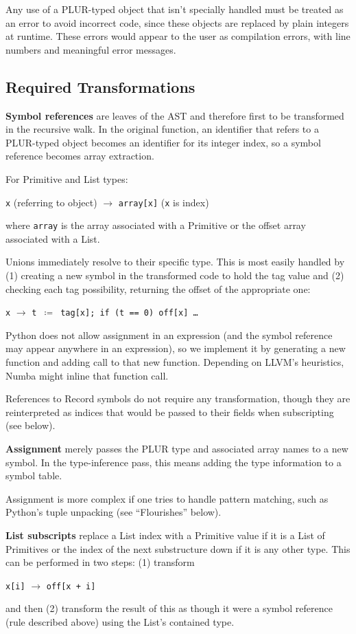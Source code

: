\documentclass[10pt, conference, compsocconf]{IEEEtran}
\begin{document}
Any use of a PLUR-typed object that isn't specially handled must be treated as an error to avoid incorrect code, since these objects are replaced by plain integers at runtime. These errors would appear to the user as compilation errors, with line numbers and meaningful error messages.

\subsection{Required Transformations}

{\bf Symbol references} are leaves of the AST and therefore first to be transformed in the recursive walk. In the original function, an identifier that refers to a PLUR-typed object becomes an identifier for its integer index, so a symbol reference becomes array extraction.

For Primitive and List types:
\begin{center}
{\tt x} (referring to object) $\to$ {\tt array[x]} ({\tt x} is index)
\end{center}
where {\tt array} is the array associated with a Primitive or the offset array associated with a List.

Unions immediately resolve to their specific type. This is most easily handled by (1) creating a new symbol in the transformed code to hold the tag value and (2) checking each tag possibility, returning the offset of the appropriate one:
\begin{center}
{\tt x} $\to$ {\tt t $\coloneqq$ tag[x]; if (t == 0) off[x] \ldots}
\end{center}
Python does not allow assignment in an expression (and the symbol reference may appear anywhere in an expression), so we implement it by generating a new function and adding call to that new function. Depending on LLVM's heuristics, Numba might inline that function call.

References to Record symbols do not require any transformation, though they are reinterpreted as indices that would be passed to their fields when subscripting (see below).

{\bf Assignment} merely passes the PLUR type and associated array names to a new symbol. In the type-inference pass, this means adding the type information to a symbol table.

Assignment is more complex if one tries to handle pattern matching, such as Python's tuple unpacking (see ``Flourishes'' below).

{\bf List subscripts} replace a List index with a Primitive value if it is a List of Primitives or the index of the next substructure down if it is any other type. This can be performed in two steps: (1) transform
\begin{center}
{\tt x[i]} $\to$ {\tt off[x + i]}
\end{center}
and then (2) transform the result of this as though it were a symbol reference (rule described above) using the List's contained type.
\end{document}
